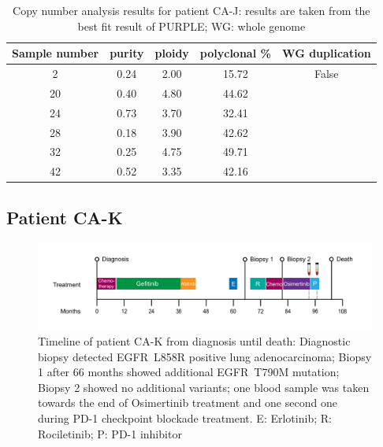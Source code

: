 \begin{table}[ht]
\caption[Copy number analysis results for patient CA-J]{Copy number analysis results for patient CA-J: results are taken from the best fit result of PURPLE; WG: whole genome}\label{tab:ca80cnv}
\centering
{}
\begin{tabular}{|c|c|c|c|c|}
\toprule
\hline
 \rowcolor{gray!50}
\textbf{Sample number} & \textbf{purity} & \textbf{ploidy} & \textbf{polyclonal \%} & \textbf{WG duplication}\\
\hline
 2  & \num{0.24} & \num{2.00} & \num{15.72} & False	\\
 20 & \num{0.40} & \num{4.80} & \num{44.62} & \cellcolor{gray!15} \\
 24 & \num{0.73} & \num{3.70} & \num{32.41} & \cellcolor{gray!15} \\
 28 & \num{0.18} & \num{3.90} & \num{42.62} & \cellcolor{gray!15} \\
 32 & \num{0.25} & \num{4.75} & \num{49.71} & \cellcolor{gray!15} \\
 42 & \num{0.52} & \num{3.35} & \num{42.16} & \cellcolor{gray!15}\multirow{-5}{*}{True} \\
 \hline
\bottomrule
\end{tabular}
\end{table} 


\cleardoublepage

\subsection{Patient CA-K}
\label{cascade-sec:CA82}

\begin{figure}[ht]
\centering
\includegraphics[width=.99\linewidth]{Figures/CASCADE/CA82/CA-K_timeline}
\caption[Timeline of patient CA-K from diagnosis until death]{Timeline of patient CA-K from diagnosis until death: Diagnostic biopsy detected EGFR~L858R positive lung adenocarcinoma;  Biopsy 1 after 66 months showed additional EGFR~T790M mutation; Biopsy 2 showed no additional variants; one blood sample was taken towards the end of Osimertinib treatment and one second one during PD-1 checkpoint blockade treatment. E: Erlotinib; R: Rociletinib; P: PD-1 inhibitor} \label{fig:ca82timeline}
\end{figure}





